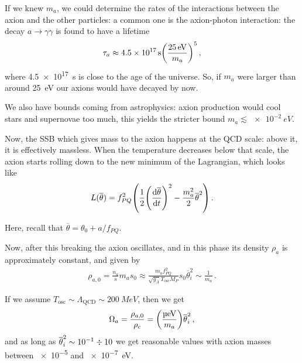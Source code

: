 \documentclass[main.tex]{subfiles}
\begin{document}
If we knew \(m_a\), we could determine the rates of the interactions between the axion and the other particles: a common one is the axion-photon interaction: the decay \(a \to \gamma \gamma \) is found to have a lifetime 
%
\begin{align}
\tau_{a} \approx \SI{4.5e17}{s} \qty(\frac{\SI{25}{eV}}{m_a})^5
\,,
\end{align}
%
where \SI{4.5e17}{s} is close to the age of the universe. So, if \(m_a\) were larger than around \SI{25}{eV} our axions would have decayed by now. 


We also have bounds coming from astrophysics: axion production would cool stars and supernovae too much, this yields the stricter bound \(m_a \lesssim \SI{e-2}{eV}\). 

Now, the SSB which gives mass to the axion happens at the QCD scale: above it, it is effectively massless.
When the temperature decreases below that scale, the axion starts rolling down to the new minimum of the Lagrangian, which looks like 
%
\begin{align}
L(\overline{\theta}) = f^2_{PQ} \qty(\frac{1}{2} \qty(\dv{\overline{\theta}}{t})^2 - \frac{m_a^2}{2} \overline{\theta}^2)
\,.
\end{align}

Here, recall that \(\overline{\theta} = \theta_0 + a / f_{PQ}\). 


Now, after this breaking the axion oscillates, and in this phase its density \(\rho_{a}\) is approximately constant, and given by 
%
\begin{align}
\rho_{a, 0} = \frac{n_a}{s} m_a s_0 \approx \frac{m_a f_{PQ}^2}{\sqrt{g_A} T _{\text{osc}} M_P} s_0 \overline{\theta}_{i}^2 \sim \frac{1}{m_a}
\,.
\end{align}

If we assume \(T _{\text{osc}} \sim \Lambda_{\text{QCD}} \sim \SI{200}{MeV}\), then we get 
%
\begin{align}
\Omega_{a} = \frac{\rho_{a, 0}}{\rho_{c}} = \qty(\frac{\SI{}{\micro eV}}{m_a}) \overline{\theta}_{i}^2
\,,
\end{align}
%
and as long as \(\overline{\theta}_{i}^2 \sim \num{e-1} \divisionsymbol \num{10}\) we get reasonable values with axion masses between \num{e-5} and \SI{e-7}{eV}. 
\end{document}
